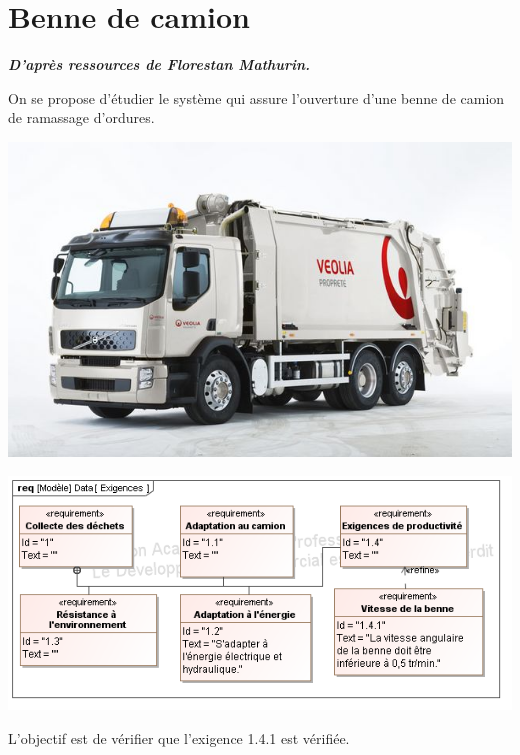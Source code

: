 \documentclass[10pt,fleqn]{article} %
\begin{document}
\newpage

\section{Benne de camion}
\begin{flushright}
\textbf{\textit{D'après ressources de Florestan Mathurin.}}
\end{flushright}
\setcounter{exo}{0}
On se propose d'étudier le système qui assure l'ouverture d'une benne de camion de ramassage d'ordures.

\begin{minipage}[c]{.3\linewidth}
\begin{center}
\includegraphics[width=.95\textwidth]{images/fig3_1}\hfill
\end{center}
\end{minipage} \hfill
\begin{minipage}[c]{.65\linewidth}
\begin{center}
\includegraphics[width=.95\textwidth]{images/SysML/Exigences_Benne}
\end{center}
\end{minipage}

\begin{obj}
L'objectif est de vérifier que l'exigence 1.4.1 est vérifiée.
\end{obj}
\end{document}
